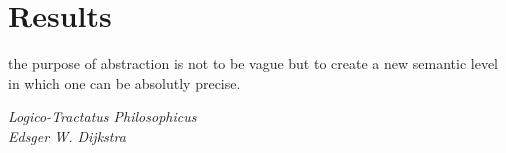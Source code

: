 \chapter{Results}\label{chapter:Results}

\epigraph{the purpose of abstraction is not to be vague but to create a new semantic level in which one can be absolutly precise.}{\textit{Logico-Tractatus Philosophicus\\Edsger W. Dijkstra}}
